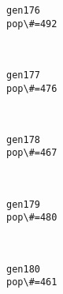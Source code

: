 \documentclass[11pt]{article}
\begin{document}
    \begin{Verbatim}[commandchars=\\\{\}]
gen176
pop\#=492

    \end{Verbatim}

    \begin{center}
    \end{center}
    { \hspace*{\fill} \\}
    
    \begin{Verbatim}[commandchars=\\\{\}]
gen177
pop\#=476

    \end{Verbatim}

    \begin{center}
    \end{center}
    { \hspace*{\fill} \\}
    
    \begin{Verbatim}[commandchars=\\\{\}]
gen178
pop\#=467

    \end{Verbatim}

    \begin{center}
    \end{center}
    { \hspace*{\fill} \\}
    
    \begin{Verbatim}[commandchars=\\\{\}]
gen179
pop\#=480

    \end{Verbatim}

    \begin{center}
    \end{center}
    { \hspace*{\fill} \\}
    
    \begin{Verbatim}[commandchars=\\\{\}]
gen180
pop\#=461

    \end{Verbatim}
\end{document}

